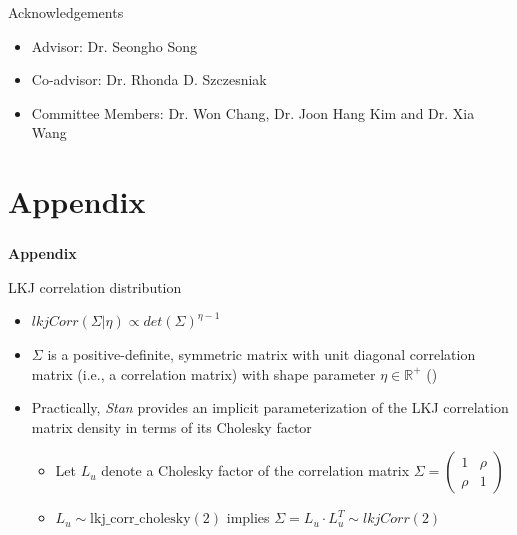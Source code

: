\documentclass[fleqn]{beamer}
\begin{document}
\begin{frame}{Acknowledgements}
\begin{itemize}
    \item Advisor: Dr. Seongho Song
    \item Co-advisor: Dr. Rhonda D. Szczesniak
    \item Committee Members: Dr. Won Chang, Dr. Joon Hang Kim and Dr. Xia Wang    
\end{itemize}
\end{frame}


\section[Appendix]{Appendix}
\setcounter{subsection}{1}
\begin{frame}
\frametitle{}
\begin{center}
\textbf{\Large Appendix}
\end{center}
\end{frame}

\begin{frame}{LKJ correlation distribution}
\small
\begin{itemize}
    \item $lkjCorr(\Sigma|\eta) \propto det(\Sigma)^{\eta-1}$ 
    \item $\Sigma$ is a positive-definite, symmetric matrix with unit diagonal correlation matrix (i.e., a correlation matrix) with shape parameter $\eta \in \mathbb{R}^+$ (\cite{Lewandowski2009})
    \item Practically, \emph{Stan} provides an implicit parameterization of the LKJ correlation matrix density in terms of its Cholesky factor
    \begin{itemize}
          \item Let $L_u$ denote a Cholesky factor of the correlation matrix $\Sigma=\begin{pmatrix}
    1 & \rho \\
    \rho & 1
    \end{pmatrix}$
        \item $L_u \sim \mbox{lkj\_corr\_cholesky}(2)$ implies $\Sigma = L_u \cdot L^{T}_u \sim lkjCorr(2)$
    \end{itemize}
\end{itemize}

\end{frame}
\end{document}
